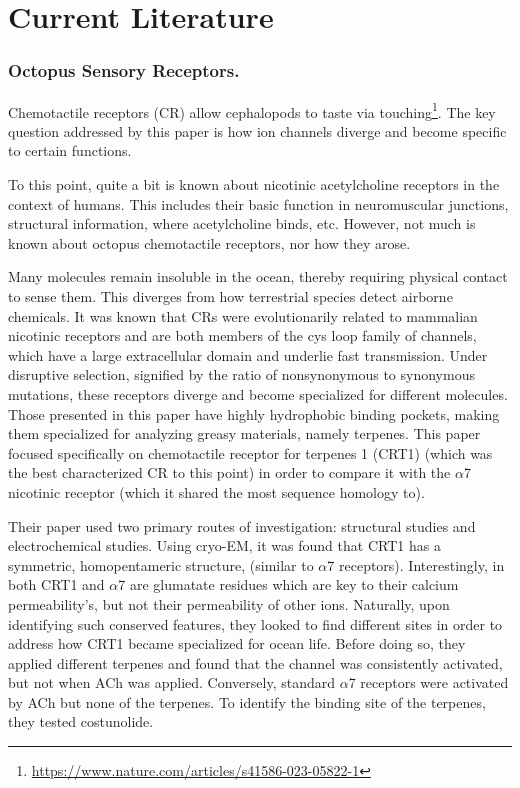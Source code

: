 \section{Current Literature}

\subsubsection{Octopus Sensory Receptors.}
Chemotactile receptors (CR) allow cephalopods to taste via touching\footnote{\url{https://www.nature.com/articles/s41586-023-05822-1}}. The key question addressed by this paper is how ion channels diverge and become specific to certain functions.\newline

To this point, quite a bit is known about nicotinic acetylcholine receptors in the context of humans. This includes their basic function in neuromuscular junctions, structural information, where acetylcholine binds, etc. However, not much is known about octopus chemotactile receptors, nor how they arose.\newline

Many molecules remain insoluble in the ocean, thereby requiring physical contact to sense them. This diverges from how terrestrial species detect airborne chemicals. It was known that CRs were evolutionarily related to mammalian nicotinic receptors and are both members of the cys loop family of channels, which have a large extracellular domain and underlie fast transmission. Under disruptive selection, signified by the ratio of nonsynonymous to synonymous mutations, these receptors diverge and become specialized for different molecules. Those presented in this paper have highly hydrophobic binding pockets, making them specialized for analyzing greasy materials, namely terpenes. This paper focused specifically on chemotactile receptor for terpenes 1 (CRT1) (which was the best characterized CR to this point) in order to compare it with the $\alpha$7 nicotinic receptor (which it shared the most sequence homology to).\newline

Their paper used two primary routes of investigation: structural studies and electrochemical studies. Using cryo-EM, it was found that CRT1 has a symmetric, homopentameric structure, (similar to $\alpha$7 receptors). Interestingly, in both CRT1 and $\alpha$7 are glumatate residues which are key to their calcium permeability's, but not their permeability of other ions. Naturally, upon identifying such conserved features, they looked to find different sites in order to address how CRT1 became specialized for ocean life. Before doing so, they applied different terpenes and found that the channel was consistently activated, but not when ACh was applied. Conversely, standard $\alpha$7 receptors were activated by ACh but none of the terpenes. To identify the binding site of the terpenes, they tested costunolide.\newline

